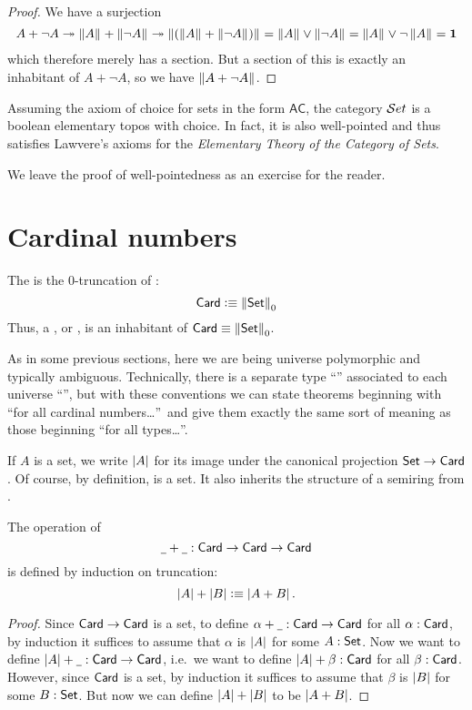 \begin{proof}
  We have a surjection
\[
A + \neg A \twoheadrightarrow \left\Vert A\right\Vert_{} + \left\Vert \neg A\right\Vert_{} \twoheadrightarrow \left\Vert (\left\Vert A\right\Vert_{} + \left\Vert \neg A\right\Vert_{})\right\Vert_{} = \left\Vert A\right\Vert_{} \vee \left\Vert \neg A\right\Vert_{} = \left\Vert A\right\Vert_{} \vee \neg \left\Vert A\right\Vert_{} = \mathbf{1}
\]
which therefore merely has a section.
But a section of this is exactly an inhabitant of $A+\neg A$, so we have $\left\Vert A+\neg A\right\Vert_{}$.
\end{proof}


\begin{thm}\label{thm:ETCS} Assuming the axiom of choice for sets in the form $\mathsf{AC}$, the category $\mathcal{S}et$ is a boolean elementary topos with choice.  In fact, it is also well-pointed and thus satisfies Lawvere's axioms for the \emph{Elementary Theory of the Category of Sets}.
 \end{thm}

We leave the proof of well-pointedness as an exercise for the reader.


\section{Cardinal numbers}
\label{sec:cardinals}

\begin{defn}
  The  is the 0-truncation of \set:
  \[ \mathsf{Card} \vcentcolon\equiv \left\Vert \mathsf{Set}\right\Vert_{0} \]
  Thus, a , or , is an inhabitant of $\mathsf{Card}\equiv \left\Vert \mathsf{Set}\right\Vert_{0}$.
\end{defn}

\begin{rmk}
  As in some previous sections, here we are being universe polymorphic and typically ambiguous.
  Technically, there is a separate type ``\card'' associated to each universe ``\type'', but with these conventions we can state theorems beginning with ``for all cardinal numbers\dots''\ and give them exactly the same sort of meaning as those beginning ``for all types\dots''.
\end{rmk}

If $A$ is a set, we write $\left|A\right|$ for its image under the canonical projection $\mathsf{Set} \to \mathsf{Card}$.
Of course, by definition, \card is a set.
It also inherits the structure of a semiring from \set.

\begin{defn}
  The operation of 
  \[ \mathord{\underline{\hspace{1ex}}}+\mathord{\underline{\hspace{1ex}}} : \mathsf{Card} \to \mathsf{Card} \to \mathsf{Card} \]
  is defined by induction on truncation:
  \[ \left|A\right| + \left|B\right| \vcentcolon\equiv \left|A+B\right| .\]
\end{defn}
\begin{proof}
  Since $\mathsf{Card}\to\mathsf{Card}$ is a set, to define $\alpha+\mathord{\underline{\hspace{1ex}}}:\mathsf{Card}\to\mathsf{Card}$ for all $\alpha:\mathsf{Card}$, by induction it suffices to assume that $\alpha$ is $\left|A\right|$ for some $A:\mathsf{Set}$.
  Now we want to define $\left|A\right|+\mathord{\underline{\hspace{1ex}}} :\mathsf{Card}\to\mathsf{Card}$, i.e.\ we want to define $\left|A\right|+\beta :\mathsf{Card}$ for all $\beta:\mathsf{Card}$.
  However, since $\mathsf{Card}$ is a set, by induction it suffices to assume that $\beta$ is $\left|B\right|$ for some $B:\mathsf{Set}$.
  But now we can define $\left|A\right|+\left|B\right|$ to be $\left|A+B\right|$.
\end{proof}

